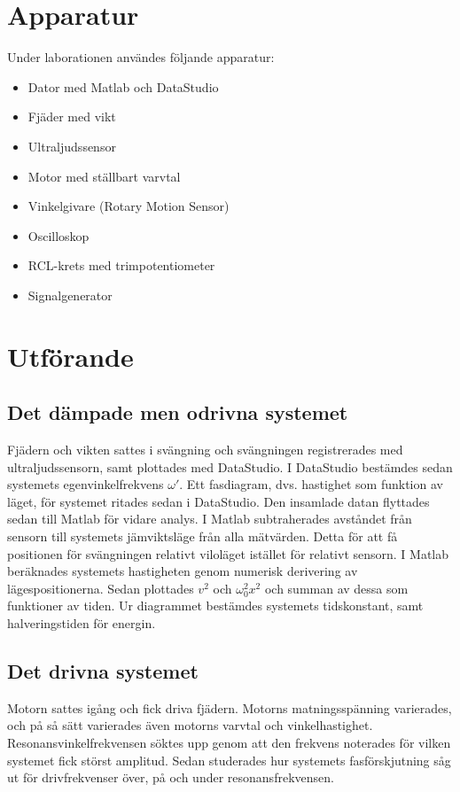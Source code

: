 \documentclass[a4paper,10pt]{article}
\begin{document}
\section{Apparatur}
Under laborationen användes följande apparatur:
\begin{itemize}
	\item Dator med Matlab och DataStudio
	\item Fjäder med vikt
	\item Ultraljudssensor
	\item Motor med ställbart varvtal
	\item Vinkelgivare (Rotary Motion Sensor)
	\item Oscilloskop
	\item RCL-krets med trimpotentiometer
	\item Signalgenerator
\end{itemize}

\section{Utförande}
\subsection{Det dämpade men odrivna systemet}
Fjädern och vikten sattes i svängning och svängningen registrerades med ultraljudssensorn, samt plottades med DataStudio. I DataStudio bestämdes sedan systemets egenvinkelfrekvens $\omega'$. Ett fasdiagram, dvs. hastighet som funktion av läget, för systemet ritades sedan i DataStudio. Den insamlade datan flyttades sedan till Matlab för vidare analys. I Matlab subtraherades avståndet från sensorn till systemets jämviktsläge från alla mätvärden. Detta för att få positionen för svängningen relativt viloläget istället för relativt sensorn. I Matlab beräknades systemets hastigheten genom numerisk derivering av lägespositionerna. Sedan plottades $v^2$ och $\omega_0^2x^2$ och summan av dessa som funktioner av tiden. Ur diagrammet bestämdes systemets tidskonstant, samt halveringstiden för energin.

\subsection{Det drivna systemet}
Motorn sattes igång och fick driva fjädern. Motorns matningsspänning varierades, och på så sätt varierades även motorns varvtal och vinkelhastighet. Resonansvinkelfrekvensen söktes upp genom att den frekvens noterades för vilken systemet fick störst amplitud. Sedan studerades hur systemets fasförskjutning såg ut för drivfrekvenser över, på och under resonansfrekvensen.
\end{document}
